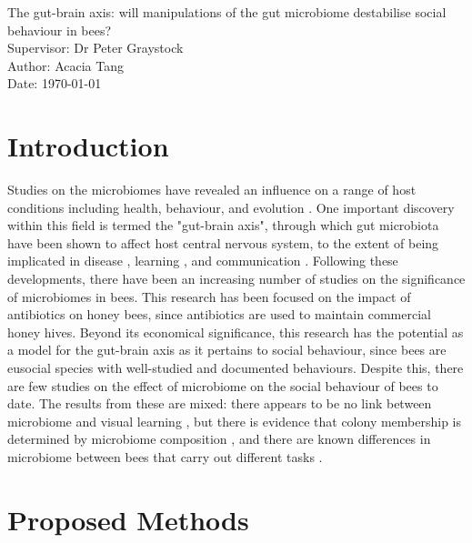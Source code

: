 \documentclass[11pt]{article}
\begin{document}
    \begin{titlepage}\centering
    \vspace*{\fill}
    \LARGE The gut-brain axis: will manipulations of the gut microbiome destabilise social behaviour in bees?\\
    \vspace{\baselineskip}
    \LARGE Supervisor: Dr Peter Graystock\\
    \vspace{\baselineskip}
    \normalsize Author: Acacia Tang\\
    \normalsize Date: {\today}
    \vspace*{\fill}
    \end{titlepage}
  
    \newpage
    \section{Introduction}
        Studies on the microbiomes have revealed an influence on a range of host conditions including health, behaviour, and evolution
        \cite{}.
        One important discovery within this field is termed the "gut-brain axis",
        through which gut microbiota have been shown to affect host central nervous system,
        to the extent of being implicated in disease
        \cite{},
        learning
        \cite{},
        and communication
        \cite{}.
        Following these developments,
        there have been an increasing number of studies on the significance of microbiomes in bees.
        This research has been focused on the impact of antibiotics on honey bees, since antibiotics are used to maintain commercial honey hives.
        Beyond its economical significance, this research has the potential as a model for the gut-brain axis as it pertains to social behaviour,
        since bees are eusocial species with well-studied and documented behaviours.
        Despite this, there are few studies on the effect of microbiome on the social behaviour of bees to date.
        The results from these are mixed: there appears to be no link between microbiome and visual learning
        \cite{leger2020gut},
        but there is evidence that colony membership is determined by microbiome composition
        \cite{vernier2020gut},
        and there are known differences in microbiome between bees that carry out different tasks
        \cite{jones2018gut}.
        

    \section{Proposed Methods}
\end{document}

